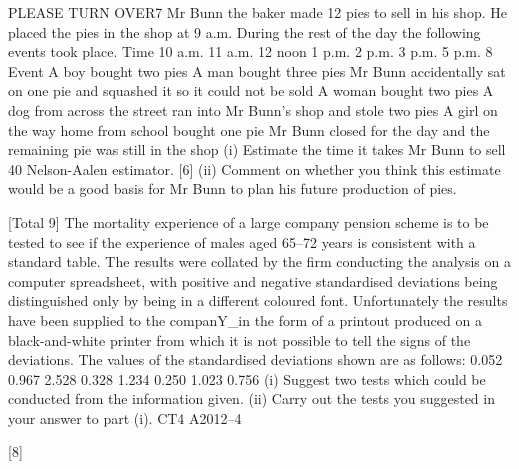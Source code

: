 PLEASE TURN OVER7
Mr Bunn the baker made 12 pies to sell in his shop. He placed the pies in the shop at
9 a.m. During the rest of the day the following events took place.
Time
10 a.m.
11 a.m.
12 noon
1 p.m.
2 p.m.
3 p.m.
5 p.m.
8
Event
A boy bought two pies
A man bought three pies
Mr Bunn accidentally sat on one pie and squashed it so it could not be
sold
A woman bought two pies
A dog from across the street ran into Mr Bunn’s shop and stole two
pies
A girl on the way home from school bought one pie
Mr Bunn closed for the day and the remaining pie was still in the shop
(i) Estimate the time it takes Mr Bunn to sell 40%
Nelson-Aalen estimator.
[6]
(ii) Comment on whether you think this estimate would be a good basis for Mr
Bunn to plan his future production of pies.

[Total 9]
The mortality experience of a large company pension scheme is to be tested to see if
the experience of males aged 65–72 years is consistent with a standard table. The
results were collated by the firm conducting the analysis on a computer spreadsheet,
with positive and negative standardised deviations being distinguished only by being
in a different coloured font. Unfortunately the results have been supplied to the
companY_in the form of a printout produced on a black-and-white printer from which
it is not possible to tell the signs of the deviations.
The values of the standardised deviations shown are as follows:
0.052
0.967
2.528
0.328
1.234
0.250
1.023
0.756
(i) Suggest two tests which could be conducted from the information given.
(ii) Carry out the tests you suggested in your answer to part (i).
CT4 A2012–4

[8]


